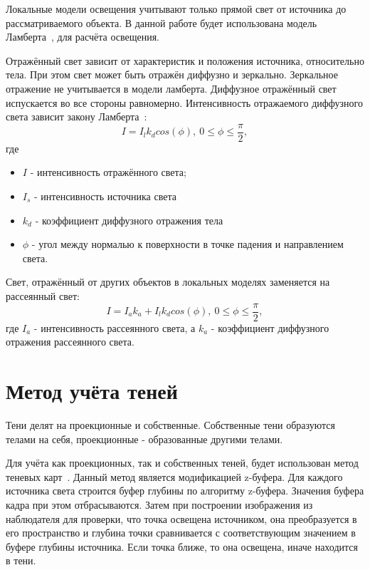 Локальные модели освещения учитывают только прямой свет от источника до рассматриваемого объекта. В данной работе будет использована модель Ламберта~\cite{kazancev}, для расчёта освещения.

Отражённый свет зависит от характеристик и положения источника, относительно тела. При этом свет может быть отражён диффузно и зеркально. Зеркальное отражение не учитывается в модели ламберта. Диффузное отражённый свет испускается во все стороны равномерно. Интенсивность отражаемого диффузного света зависит закону Ламберта~\cite{kazancev}:
\begin{equation}
	\label{eq:lambert1}
	I = I_{l}k_dcos(\phi),\ 0\leq\phi\leq\frac{\pi}{2},
\end{equation}
где
\begin{itemize}
	\item $I$ - интенсивность отражённого света;
	\item $I_s$ - интенсивность источника света
	\item $k_d$ - коэффициент диффузного отражения тела
	\item $\phi$ - угол между нормалью к поверхности в точке падения и направлением света.
\end{itemize} 

Свет, отражённый от других объектов в локальных моделях заменяется на рассеянный свет:
\begin{equation}
	\label{eq:lambert2}
	I = I_ak_a + I_{l}k_dcos(\phi),\ 0\leq\phi\leq\frac{\pi}{2},
\end{equation}
где $I_a$ - интенсивность рассеянного света, а $k_a$ - коэффициент диффузного отражения рассеянного света. 

\section{Метод учёта теней}

Тени делят на проекционные и собственные. Собственные тени образуются телами на себя, проекционные - образованные другими телами.

Для учёта как проекционных, так и собственных теней, будет использован метод теневых карт~\cite{gabriella}. Данный метод является модификацией z-буфера. Для каждого источника света строится буфер глубины по алгоритму z-буфера. Значения буфера кадра при этом отбрасываются. Затем при построении изображения из наблюдателя для проверки, что точка освещена источником, она преобразуется в его пространство и глубина точки сравнивается с соответствующим значением в буфере глубины источника. Если точка ближе, то она освещена, иначе находится в тени.


